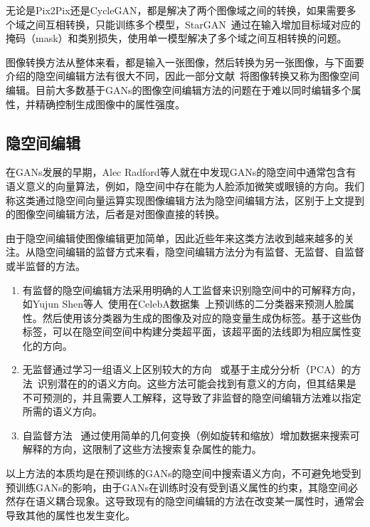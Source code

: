 无论是Pix2Pix还是CycleGAN，都是解决了两个图像域之间的转换，如果需要多个域之间互相转换，只能训练多个模型，StarGAN~\cite{stargan}通过在输入增加目标域对应的掩码（mask）和类别损失，使用单一模型解决了多个域之间互相转换的问题。

图像转换方法从整体来看，都是输入一张图像，然后转换为另一张图像，与下面要介绍的隐空间编辑方法有很大不同，因此一部分文献~\cite{iclr2021}将图像转换又称为图像空间编辑。目前大多数基于GANs的图像空间编辑方法的问题在于难以同时编辑多个属性，并精确控制生成图像中的属性强度。

\subsection{隐空间编辑}

在GANs发展的早期，Alec Radford等人就在\cite{DCGAN}中发现GANs的隐空间中通常包含有语义意义的向量算法，例如，隐空间中存在能为人脸添加微笑或眼镜的方向。我们称这类通过隐空间向量运算实现图像编辑方法为隐空间编辑方法，区别于上文提到的图像空间编辑方法，后者是对图像直接的转换。

由于隐空间编辑使图像编辑更加简单，因此近些年来这类方法收到越来越多的关注。从隐空间编辑的监督方式来看，隐空间编辑方法分为有监督、无监督、自监督或半监督的方法。

\begin{enumerate}
\item 有监督的隐空间编辑方法采用明确的人工监督来识别隐空间中的可解释方向，如Yujun Shen等人~\cite{interfacegan}使用在CelebA数据集~\cite{celeba}上预训练的二分类器来预测人脸属性。然后使用该分类器为生成的图像及对应的隐变量生成伪标签。基于这些伪标签，可以在隐空间空间中构建分类超平面，该超平面的法线即为相应属性变化的方向。

\item 无监督通过学习一组语义上区别较大的方向~\cite{icml2020} 或基于主成分分析（PCA）的方法~\cite{harkonen2020ganspace}识别潜在的的语义方向。这些方法可能会找到有意义的方向，但其结果是不可预测的，并且需要人工解释，这导致了非监督的隐空间编辑方法难以指定所需的语义方向。

\item 自监督方法~\cite{steer,variation} 通过使用简单的几何变换（例如旋转和缩放）增加数据来搜索可解释的方向，这限制了这些方法搜索复杂属性的能力。
\end{enumerate}

以上方法的本质均是在预训练的GANs的隐空间中搜索语义方向，不可避免地受到预训练GANs的影响，由于GANs在训练时没有受到语义属性的约束，其隐空间必然存在语义耦合现象。这导致现有的隐空间编辑的方法在改变某一属性时，通常会导致其他的属性也发生变化。    

